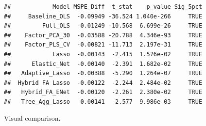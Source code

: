 \documentclass[
]{article}
\newenvironment{Shaded}{\begin{snugshade}}{\end{snugshade}}
\newcommand{\AttributeTok}[1]{\textcolor[rgb]{0.13,0.29,0.53}{#1}}
\newcommand{\CommentTok}[1]{\textcolor[rgb]{0.56,0.35,0.01}{\textit{#1}}}
\newcommand{\ConstantTok}[1]{\textcolor[rgb]{0.56,0.35,0.01}{#1}}
\newcommand{\ControlFlowTok}[1]{\textcolor[rgb]{0.13,0.29,0.53}{\textbf{#1}}}
\newcommand{\DecValTok}[1]{\textcolor[rgb]{0.00,0.00,0.81}{#1}}
\newcommand{\FloatTok}[1]{\textcolor[rgb]{0.00,0.00,0.81}{#1}}
\newcommand{\FunctionTok}[1]{\textcolor[rgb]{0.13,0.29,0.53}{\textbf{#1}}}
\newcommand{\NormalTok}[1]{#1}
\newcommand{\OtherTok}[1]{\textcolor[rgb]{0.56,0.35,0.01}{#1}}
\newcommand{\SpecialCharTok}[1]{\textcolor[rgb]{0.81,0.36,0.00}{\textbf{#1}}}
\begin{document}
\begin{Shaded}
\end{Shaded}

\begin{verbatim}
##            Model MSPE_Diff  t_stat    p_value Sig_5pct
##     Baseline_OLS  -0.09949 -36.524 1.040e-266     TRUE
##         Full_OLS  -0.01249 -10.568  6.699e-26     TRUE
##    Factor_PCA_30  -0.03588 -20.788  4.346e-93     TRUE
##    Factor_PLS_CV  -0.00821 -11.713  2.197e-31     TRUE
##            Lasso  -0.00143  -2.415  1.576e-02     TRUE
##      Elastic_Net  -0.00140  -2.391  1.682e-02     TRUE
##   Adaptive_Lasso  -0.00388  -5.290  1.264e-07     TRUE
##  Hybrid_FA_Lasso  -0.00122  -2.244  2.484e-02     TRUE
##   Hybrid_FA_ENet  -0.00120  -2.261  2.380e-02     TRUE
##   Tree_Agg_Lasso  -0.00141  -2.577  9.986e-03     TRUE
\end{verbatim}

Visual comparison.
\end{document}
